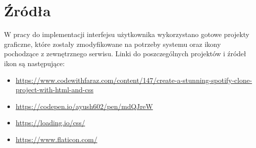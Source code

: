 \chapter{Źródła}

W pracy do implementacji interfejsu użytkownika wykorzystano gotowe projekty graficzne, które zostały zmodyfikowane na potrzeby systemu oraz ikony pochodzące z zewnętrznego serwisu. Linki do poszczególnych projektów i źródeł ikon są następujące:
\begin{itemize}
\item \url{https://www.codewithfaraz.com/content/147/create-a-stunning-spotify-clone-project-with-html-and-css}
\item \url{https://codepen.io/ayush602/pen/mdQJreW}
\item \url{https://loading.io/css/}
\item \url{https://www.flaticon.com/}
\end{itemize}
